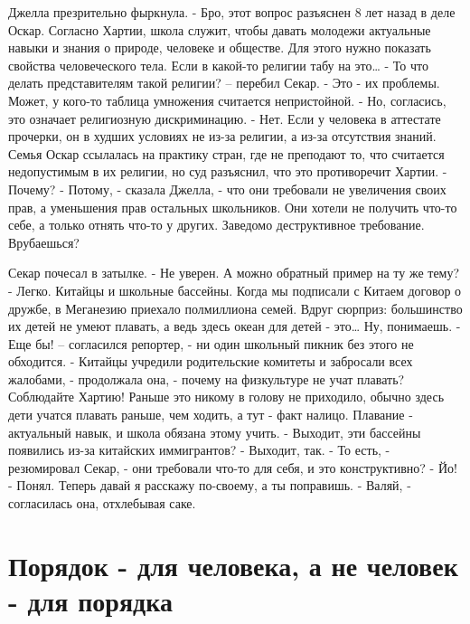 \documentclass[10pt,final]{book}
\begin{document}
Джелла презрительно фыркнула.
- Бро, этот вопрос разъяснен 8 лет назад в деле Оскар. Согласно Хартии, школа служит, чтобы давать молодежи актуальные навыки и знания о природе, человеке и обществе. Для этого нужно показать свойства человеческого тела. Если в какой-то религии табу на это\ldots{}
- То что делать представителям такой религии? -- перебил Секар.
- Это - их проблемы. Может, у кого-то таблица умножения считается непристойной.
- Но, согласись, это означает религиозную дискриминацию.
- Нет. Если у человека в аттестате прочерки, он в худших условиях не из-за религии, а из-за отсутствия знаний. Семья Оскар ссылалась на практику стран, где не преподают то, что считается недопустимым в их религии, но суд разъяснил, что это противоречит Хартии.
- Почему?
- Потому, - сказала Джелла, - что они требовали не увеличения своих прав, а уменьшения прав остальных школьников. Они хотели не получить что-то себе, а только отнять что-то у других. Заведомо деструктивное требование. Врубаешься?

Секар почесал в затылке.
- Не уверен. А можно обратный пример на ту же тему?
- Легко. Китайцы и школьные бассейны. Когда мы подписали с Китаем договор о дружбе, в Меганезию приехало полмиллиона семей. Вдруг сюрприз: большинство их детей не умеют плавать, а ведь здесь океан для детей - это\ldots{} Ну, понимаешь.
- Еще бы! -- согласился репортер, - ни один школьный пикник без этого не обходится.
- Китайцы учредили родительские комитеты и забросали всех жалобами, - продолжала она, - почему на физкультуре не учат плавать? Соблюдайте Хартию! Раньше это никому в голову не приходило, обычно здесь дети учатся плавать раньше, чем ходить, а тут - факт налицо. Плавание - актуальный навык, и школа обязана этому учить.
- Выходит, эти бассейны появились из-за китайских иммигрантов?
- Выходит, так.
- То есть, - резюмировал Секар, - они требовали что-то для себя, и это конструктивно?
- Йо!
- Понял. Теперь давай я расскажу по-своему, а ты поправишь.
- Валяй, - согласилась она, отхлебывая саке.



\chapter{Порядок - для человека, а не человек - для порядка}
\end{document}
